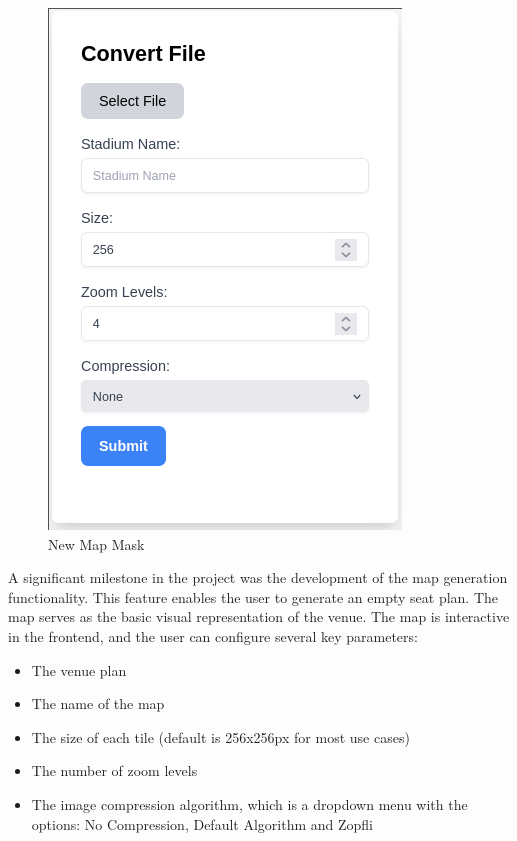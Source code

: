 
\begin{figure}
    \begin{center}
        \includegraphics[scale=0.5]{pics/new_map_mask.png}
        \caption{New Map Mask}
        \label{fig:impl:mapgen}
    \end{center}
\end{figure}

A significant milestone in the project was the development of the map generation functionality. This feature enables the user to generate an empty seat plan. The map serves as the basic visual representation of the venue. The map is interactive in the frontend, and the user can configure several key parameters:

\begin{itemize} 
    \item The venue plan 
    \item The name of the map 
    \item The size of each tile (default is 256x256px for most use cases) 
    \item The number of zoom levels 
    \item The image compression algorithm, which is a dropdown menu with the options: No Compression, Default Algorithm and Zopfli \end{itemize}

